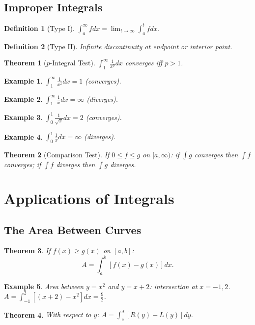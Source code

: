 \documentclass[11pt,a4paper]{article}
\newtheorem{example}{Example}
\newtheorem{theorem}{Theorem}
\newtheorem{definition}{Definition}
\begin{document}
\subsection{Improper Integrals}
\begin{definition}[Type I]
$\int_a^{\infty} f dx = \lim_{t \to \infty} \int_a^t f dx$.
\end{definition}
\begin{definition}[Type II]
Infinite discontinuity at endpoint or interior point.
\end{definition}
\begin{theorem}[$p$-Integral Test]
$\int_1^{\infty} \frac{1}{x^p} dx$ converges iff $p > 1$.
\end{theorem}
\begin{example}
$\int_1^{\infty} \frac{1}{x^2} dx = 1$ (converges).
\end{example}
\begin{example}
$\int_1^{\infty} \frac{1}{x} dx = \infty$ (diverges).
\end{example}
\begin{example}
$\int_0^1 \frac{1}{\sqrt{x}} dx = 2$ (converges).
\end{example}
\begin{example}
$\int_0^1 \frac{1}{x} dx = \infty$ (diverges).
\end{example}
\begin{theorem}[Comparison Test]
If $0 \leq f \leq g$ on $[a, \infty)$: if $\int g$ converges then $\int f$ converges; if $\int f$ diverges then $\int g$ diverges.
\end{theorem}
\section{Applications of Integrals}
\subsection{The Area Between Curves}
\begin{theorem}
If $f(x) \geq g(x)$ on $[a,b]$:
\[
A = \int_a^b [f(x) - g(x)] dx.
\]
\end{theorem}
\begin{example}
Area between $y = x^2$ and $y = x+2$: intersection at $x = -1, 2$. $A = \int_{-1}^2 [(x+2) - x^2] dx = \frac{9}{2}$.
\end{example}
\begin{theorem}
With respect to $y$: $A = \int_c^d [R(y) - L(y)] dy$.
\end{theorem}
\end{document}
